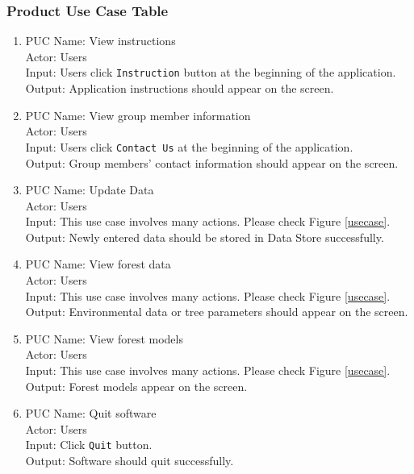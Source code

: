 \documentclass{article}
\begin{document}
\subsubsection{Product Use Case Table}
\begin{enumerate}
\item PUC Name: View instructions\\
Actor: Users\\
Input: Users click \verb|Instruction| button at the beginning of the
application.\\
Output: Application instructions should appear on the screen. 

\item PUC Name: View group member information\\
Actor: Users\\
Input: Users click \verb|Contact Us| at the beginning of the application.\\
Output: Group members' contact information should appear on the screen.

\item PUC Name: Update Data\\
Actor: Users\\
Input: This use case involves many actions. Please check Figure \ref{usecase}.\\
Output: Newly entered data should be stored in Data Store successfully. 

\item PUC Name: View  forest  data\\
Actor: Users\\
Input: This use case involves many actions. Please check Figure \ref{usecase}.\\
Output: Environmental data or tree parameters should appear on the screen.

\item PUC Name: View forest models\\
Actor: Users\\
Input: This use case involves many actions. Please check Figure \ref{usecase}.\\
Output: Forest models appear on the screen.

\item PUC Name: Quit software\\
Actor: Users\\
Input: Click \verb|Quit| button.\\
Output: Software should quit successfully.

\end{enumerate}
\end{document}
